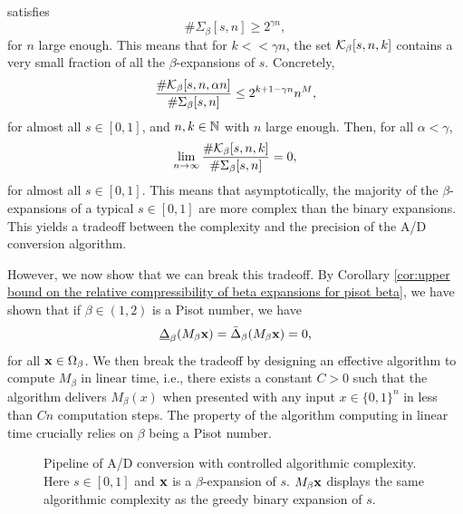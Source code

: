 	satisfies 
	\begin{equation}
		\#\Sigma_\beta[s,n] \geq 2^{\gamma n},
	\end{equation}
	for $n$ large enough. This means that for $k << \gamma n$, the set $\mathcal{K}_\beta[s,n,k]$ contains a very small fraction of all the $\beta$-expansions of $s$. Concretely,
	\begin{equation}
		\frac{\# \mathcal{K}_\beta[s,n,\alpha n]}{\#\Sigma_\beta[s,n]} \leq 2^{k+1 - \gamma n}n^M,
	\end{equation}
	for almost all $s \in [0,1]$, and $n,k \in \mathbb{N}$ with $n$ large enough. Then, for all $\alpha < \gamma$,
	\begin{equation}
		\lim_{n \to \infty} \frac{\# \mathcal{K}_\beta[s,n,k]}{\#\Sigma_\beta[s,n]} = 0,
	\end{equation}
	for almost all $s \in [0,1]$. This means that asymptotically, the majority of the $\beta$-expansions of a typical $s \in [0,1]$ are more complex than the binary expansions. This yields a tradeoff between the complexity and the precision of the A/D conversion algorithm.

	However, we now show that we can break this tradeoff. By Corollary \ref{cor:upper bound on the relative compressibility of beta expansions for pisot beta}, we have shown that if $\beta \in (1,2)$ is a Pisot number, we have
	\begin{equation}
		\underline\Delta_\beta(M_\beta{\bf x}) = \bar\Delta_\beta(M_\beta{\bf x}) = 0,
	\end{equation}
	for all ${\bf x} \in \Omega_\beta$. We then break the tradeoff by designing an effective algorithm to compute $M_\beta$ in linear time, i.e., there exists a constant $C >0$ such that the algorithm delivers $M_\beta(x)$ when presented with any input $x \in \{0,1\}^n$ in less than $Cn$ computation steps. The property of the algorithm computing in linear time crucially relies on $\beta$ being a Pisot number.

	

	\begin{figure}[H]
		\centering
			\caption{Pipeline of A/D conversion with controlled algorithmic complexity. Here $s \in [0,1]$ and ${\bf x}$ is a $\beta$-expansion of $s$. $M_\beta {\bf x}$ displays the same algorithmic complexity as the greedy binary expansion of $s$.}
	\end{figure}
	
